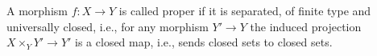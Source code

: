 A morphism $f\colon X\to Y$ is called proper if it is separated, of finite
type and universally closed, i.e., for any morphism $Y'\to Y$ the induced
projection $X\times_Y Y'\to Y'$ is a closed map, i.e., sends closed sets to
closed sets.
